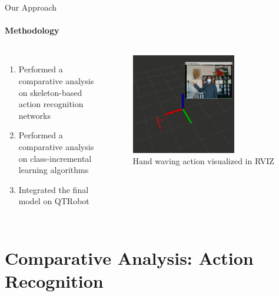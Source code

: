 \documentclass[aspectratio=169, xcolor=dvipsnames]{beamer}
\begin{document}
\begin{frame}{Our Approach}
      \framesubtitle{Methodology}%
      
      \begin{columns}
      \vspace{-0.75cm}
      \begin{enumerate}
              \item Performed a comparative analysis on skeleton-based action recognition networks
              \item Performed a comparative analysis on class-incremental learning algorithms
              \item Integrated the final model on QTRobot
      \end{enumerate}
      
      \begin{figure}[ht!]
            \centering
            \includegraphics[width=0.7\textwidth]{images/waving_action_recognition.png}
            \caption{Hand waving action visualized in RVIZ}
      \end{figure}   
      \end{columns}
\end{frame}

\section{Comparative Analysis: Action Recognition}
\end{document}
